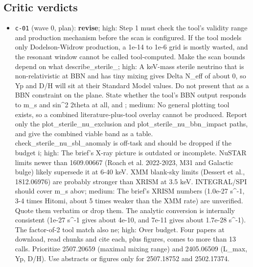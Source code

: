 \documentclass[11pt,a4paper]{article}
\begin{document}
\subsection{Critic verdicts}
\begin{itemize}
  \item \texttt{c-01} (wave 0, plan): \textbf{revise}; high: Step 1 must check the tool's validity range and production mechanism before the scan is configured. If the tool models only Dodelson-Widrow production, a 1e-14 to 1e-6 grid is mostly wasted, and the resonant window cannot be called tool-computed. Make the scan bounds depend on what describe\_sterile\_; high: A keV-mass sterile neutrino that is non-relativistic at BBN and has tiny mixing gives Delta N\_eff of about 0, so Yp and D/H will sit at their Standard Model values. Do not present that as a BBN constraint on the plane. State whether the tool's BBN output responds to m\_s and sin\textasciicircum{}2 2theta at all, and ; medium: No general plotting tool exists, so a combined literature-plus-tool overlay cannot be produced. Report only the plot\_sterile\_nu\_exclusion and plot\_sterile\_nu\_bbn\_impact paths, and give the combined viable band as a table. check\_sterile\_nu\_sbl\_anomaly is off-task and should be dropped if the budget i; high: The brief's X-ray picture is outdated or incomplete. NuSTAR limits newer than 1609.00667 (Roach et al. 2022-2023, M31 and Galactic bulge) likely supersede it at 6-40 keV. XMM blank-sky limits (Dessert et al., 1812.06976) are probably stronger than XRISM at 3.5 keV. INTEGRAL/SPI should cover m\_s abov; medium: The brief's XRISM numbers (1.0e-27 s\textasciicircum{}-1, 3-4 times Hitomi, about 5 times weaker than the XMM rate) are unverified. Quote them verbatim or drop them. The analytic conversion is internally consistent (1e-27 s\textasciicircum{}-1 gives about 4e-10, and 7e-11 gives about 1.7e-28 s\textasciicircum{}-1). The factor-of-2 tool match also ne; high: Over budget. Four papers at download, read chunks and cite each, plus figures, comes to more than 13 calls. Prioritize 2507.20659 (maximal mixing range) and 2405.06509 (L\_max, Yp, D/H). Use abstracts or figures only for 2507.18752 and 2502.17374.

\end{itemize}
\end{document}
